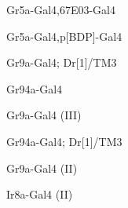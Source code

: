 \documentclass[17pt]{extarticle}
\begin{document}
\footnotesize
\vspace*{\fill}
\newpage{}
\vspace*{\fill}\begin{small}
Gr5a-Gal4,67E03-Gal4 \\[0.5em]
\end{small}
\footnotesize
\vspace*{\fill}
\newpage{}
\vspace*{\fill}\begin{footnotesize}
Gr5a-Gal4,p[BDP]-Gal4 \\[0.5em]
\end{footnotesize}
\footnotesize
\vspace*{\fill}
\newpage{}
\vspace*{\fill}\begin{small}
Gr9a-Gal4; Dr[1]/TM3 \\[0.5em]
\end{small}
\footnotesize
\vspace*{\fill}
\newpage{}
\vspace*{\fill}\begin{large}
Gr94a-Gal4 \\[0.5em]
\end{large}
\footnotesize
\vspace*{\fill}
\newpage{}
\vspace*{\fill}\begin{normalsize}
Gr9a-Gal4 (III) \\[0.5em]
\end{normalsize}
\footnotesize
\vspace*{\fill}
\newpage{}
\vspace*{\fill}\begin{footnotesize}
Gr94a-Gal4; Dr[1]/TM3 \\[0.5em]
\end{footnotesize}
\footnotesize
\vspace*{\fill}
\newpage{}
\vspace*{\fill}\begin{normalsize}
Gr9a-Gal4 (II) \\[0.5em]
\end{normalsize}
\footnotesize
\vspace*{\fill}
\newpage{}
\vspace*{\fill}\begin{normalsize}
Ir8a-Gal4 (II) \\[0.5em]
\end{normalsize}
\end{document}
